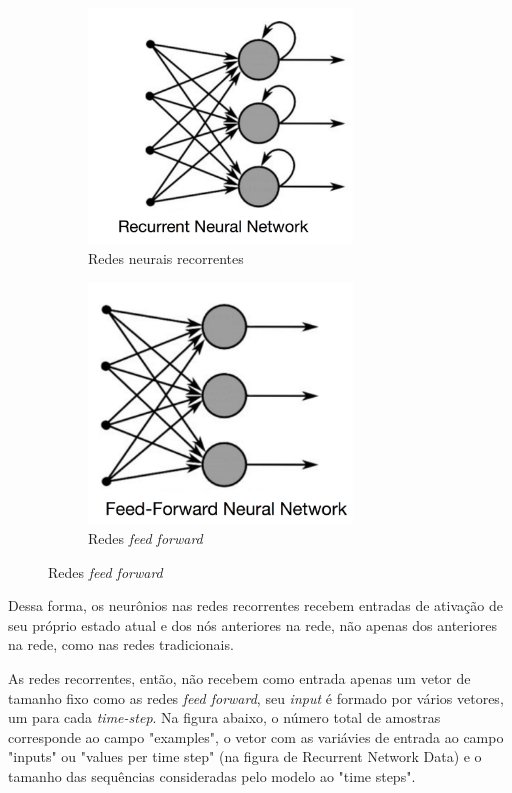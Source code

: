 \begin{figure}[H]
  \centering
  \begin{subfigure}{7cm}
      \centering
      \includegraphics[width=7cm]{../figuras/redes/rnn.png}
      \caption{Redes neurais recorrentes}
  \end{subfigure}
  \hfill
  \begin{subfigure}{7cm}
      \centering
      \includegraphics[width=7cm]{../figuras/redes/ff.png}
      \caption{Redes \textit{feed forward}}
  \end{subfigure}
\end{figure}

Dessa forma, os neurônios nas redes recorrentes recebem entradas de ativação 
de seu próprio estado atual e dos nós anteriores na rede, não apenas dos anteriores
na rede, como nas redes tradicionais.

As redes recorrentes, então, não recebem como entrada apenas um vetor de tamanho 
fixo como as redes \textit{feed forward}, seu \textit{input} é formado 
por vários vetores, um para cada \textit{time-step}. Na figura abaixo, o número
total de amostras corresponde ao campo "examples", o vetor com as 
variávies de entrada ao campo "inputs" ou "values per time step" (na 
figura de Recurrent Network Data) e o tamanho das sequências consideradas
pelo modelo ao "time steps". 

